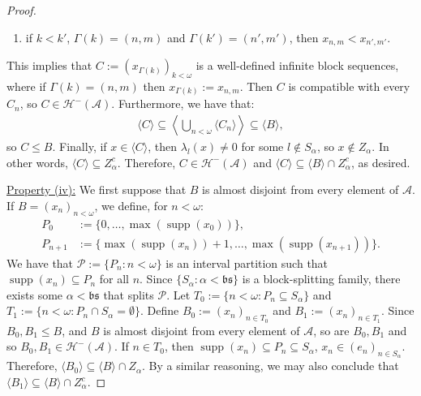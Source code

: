 \documentclass[11pt,reqno]{amsart}
\theoremstyle{plain}
\numberwithin{equation}{section}
\theoremstyle{definition}
\newcommand{\func}{\operatorname}
\renewcommand{\c}[1]{\langle #1 \rangle}
\newcommand{\bigc}[1]{\left\langle #1 \right\rangle}
\newcommand{\Po}{\cal{P}}
\newcommand{\cal}{\mathcal}
\renewcommand{\frak}{\mathfrak}
\newcommand{\supp}{\func{supp}}
\newcommand{\A}{\cal{A}}
\renewcommand{\H}{\cal{H}}
\begin{document}
\begin{proof}
\begin{enumerate}
        \item if $k < k'$, $\Gamma(k) = (n,m)$ and $\Gamma(k') = (n',m')$, then $x_{n,m} < x_{n',m'}$.
    \end{enumerate}
    This implies that $C := (x_{\Gamma(k)})_{k<\omega}$ is a well-defined infinite block sequences, where if $\Gamma(k) = (n,m)$ then $x_{\Gamma(k)} := x_{n,m}$. Then $C$ is compatible with every $C_n$, so $C \in \H^-(\A)$. Furthermore, we have that:
    \begin{align*}
        \c{C} \subseteq \bigc{\bigcup_{n<\omega} \c{C_n}} \subseteq \c{B},
    \end{align*}
    so $C \leq B$. Finally, if $x \in \c{C}$, then $\lambda_l(x) \neq 0$ for some $l \notin S_\alpha$, so $x \notin Z_\alpha$. In other words, $\c{C} \subseteq Z_\alpha^c$. Therefore, $C \in \H^-(\A)$ and $\c{C} \subseteq \c{B} \cap Z_\alpha^c$, as desired.

    \underline{Property (iv):} We first suppose that $B$ is almost disjoint from every element of $\A$. If $B = (x_n)_{n<\omega}$, we define, for $n < \omega$:
    \begin{align*}
        P_0 &:= \{0,\dots,\max(\supp(x_0))\}, \\
        P_{n+1} &:= \{\max(\supp(x_n))+1,\dots,\max(\supp(x_{n+1}))\}.
    \end{align*}
    We have that $\Po := \{P_n : n < \omega\}$ is an interval partition such that $\supp(x_n) \subseteq P_n$ for all $n$. Since $\{S_\alpha : \alpha < \frak{bs}\}$ is a block-splitting family, there exists some $\alpha < \frak{bs}$ that splits $\Po$. Let $T_0 := \{n < \omega : P_n \subseteq S_\alpha\}$ and $T_1 := \{n < \omega : P_n \cap S_\alpha = \emptyset\}$. Define $B_0 := (x_n)_{n \in T_0}$ and $B_1 := (x_n)_{n \in T_1}$. Since $B_0,B_1 \leq B$, and $B$ is almost disjoint from every element of $\A$, so are $B_0,B_1$ and so $B_0,B_1 \in \H^-(\A)$. If $n \in T_0$, then $\supp(x_n) \subseteq P_n \subseteq S_\alpha$, $x_n \in (e_n)_{n \in S_\alpha}$. Therefore, $\c{B_0} \subseteq \c{B} \cap Z_\alpha$. By a similar reasoning, we may also conclude that $\c{B_1} \subseteq \c{B} \cap Z_\alpha^c$.


\end{proof}
\end{document}
